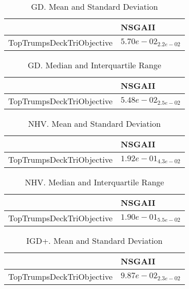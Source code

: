 \documentclass{article}
\begin{document}
\begin{table}
\caption{GD. Mean and Standard Deviation}
\label{table: GD}
\centering
\begin{scriptsize}
\begin{tabular}{ll}
\hline &  NSGAII\\
\hline 
TopTrumpsDeckTriObjective & \cellcolor{gray95}$  5.70e-02_{ 2.2e-02}$ \\
\hline
\end{tabular}
\end{scriptsize}
\end{table}

\begin{table}
\caption{GD. Median and Interquartile Range}
\label{table: GD}
\centering
\begin{scriptsize}
\begin{tabular}{ll}
\hline &  NSGAII\\
\hline 
TopTrumpsDeckTriObjective & \cellcolor{gray95}$  5.48e-02_{ 2.5e-02}$ \\
\hline
\end{tabular}
\end{scriptsize}
\end{table}

\begin{table}
\caption{NHV. Mean and Standard Deviation}
\label{table: NHV}
\centering
\begin{scriptsize}
\begin{tabular}{ll}
\hline &  NSGAII\\
\hline 
TopTrumpsDeckTriObjective & \cellcolor{gray95}$  1.92e-01_{ 4.3e-02}$ \\
\hline
\end{tabular}
\end{scriptsize}
\end{table}

\begin{table}
\caption{NHV. Median and Interquartile Range}
\label{table: NHV}
\centering
\begin{scriptsize}
\begin{tabular}{ll}
\hline &  NSGAII\\
\hline 
TopTrumpsDeckTriObjective & \cellcolor{gray95}$  1.90e-01_{ 5.5e-02}$ \\
\hline
\end{tabular}
\end{scriptsize}
\end{table}

\begin{table}
\caption{IGD+. Mean and Standard Deviation}
\label{table: IGD+}
\centering
\begin{scriptsize}
\begin{tabular}{ll}
\hline &  NSGAII\\
\hline 
TopTrumpsDeckTriObjective & \cellcolor{gray95}$  9.87e-02_{ 2.3e-02}$ \\
\hline
\end{tabular}
\end{scriptsize}
\end{table}
\end{document}
